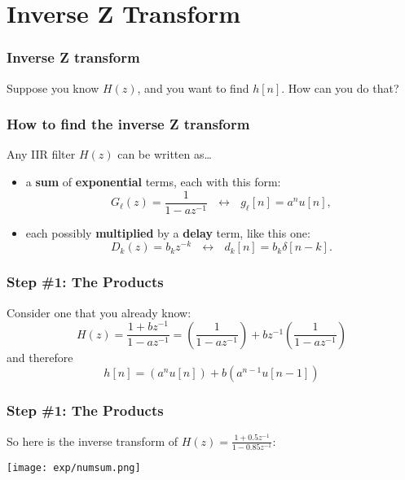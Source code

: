 \documentclass{beamer}
\begin{document}
\section[Inverse Z]{Inverse Z Transform}
\setcounter{subsection}{1}

\begin{frame}
  \frametitle{Inverse Z transform}

  Suppose you know $H(z)$, and you want to find $h[n]$.  How can you
  do that?
\end{frame}
      
\begin{frame}
  \frametitle{How to find the inverse Z transform}

  Any IIR filter $H(z)$ can be written as\ldots
  \begin{itemize}
  \item a {\bf sum} of {\bf exponential} terms, each with this form:
    \begin{displaymath}
      G_\ell(z)=\frac{1}{1-az^{-1}}~~~\leftrightarrow~~~g_\ell[n]= a^nu[n],
    \end{displaymath}
  \item each possibly {\bf multiplied} by a {\bf delay} term, like this one:
    \begin{displaymath}
      D_k(z)=b_kz^{-k}~~~\leftrightarrow~~~d_k[n]=b_k\delta[n-k].
    \end{displaymath}
  \end{itemize}
\end{frame}

\begin{frame}
  \frametitle{Step \#1: The Products}

  Consider one that you already know:
  \begin{displaymath}
    H(z)=\frac{1+bz^{-1}}{1-az^{-1}}
    =\left(\frac{1}{1-az^{-1}}\right)+bz^{-1}\left(\frac{1}{1-az^{-1}}\right)
  \end{displaymath}
  and therefore
  \begin{displaymath}
    h[n] = \left(a^nu[n]\right) + b\left(a^{n-1}u[n-1]\right)
  \end{displaymath}
\end{frame}

\begin{frame}
  \frametitle{Step \#1: The Products}

  So here is the inverse transform of $H(z)=\frac{1+0.5z^{-1}}{1-0.85z^{-1}}$:
  \centerline{\texttt{[image: exp/numsum.png]}}
\end{frame}
\end{document}
